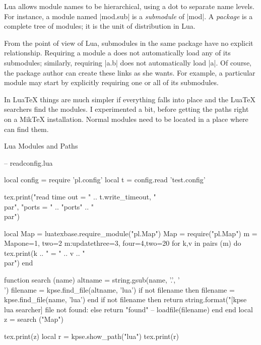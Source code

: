Lua allows module names to be hierarchical, using a dot to separate name levels. For instance, a module named |mod.sub| is a \textit{submodule} of |mod|. A \textit{package} is a complete tree of modules; it is the unit of distribution in Lua. 

From the point of view of Lua, submodules in the same package have no explicit relationship. Requiring a module a does not automatically load any of its submodules; similarly, requiring |a.b| does not automatically load |a|. Of course, the package author can create these links as she wants. For example, a particular module may start by explicitly requiring one or all of its submodules.

In LuaTeX things are much simpler if everything falls into place and the LuaTeX searchers find the modules. I experimented a bit, before getting the paths right on a MikTeX installation. Normal modules need to be located in a place where \tex can find them.


\begin{texexample}{Lua Modules and Paths}{}

\begin{luacode}
  -- readconfig.lua
  
local config       = require 'pl.config'
local t               = config.read 'test.config'

tex.print("read time out = " .. t.write_timeout, "\\par",
            "ports = " .. "ports" .. "\\par")

 local Map = luatexbase.require_module("pl.Map")   
 Map = require("pl.Map")
   m = Map{one=1, two=2}
   m:update{three=3, four=4,two=20}
   for k,v in pairs (m) do
       tex.print(k .. " = " .. v .. "\\par")
   end 
   
 function search (name)
    altname = string.gsub(name, '.', '\\')
    filename = kpse.find_file(altname, 'lua')	
    if not filename then
      filename = kpse.find_file(name, 'lua')
    end
    if not filename then
      return string.format("[kpse lua searcher] file not found: %
    else
      return "found" -- loadfile(filename)
    end
end
local z = search ("Map")

tex.print(z)
local r = kpse.show_path("lua")
tex.print(r)
\end{luacode}
\end{texexample}



